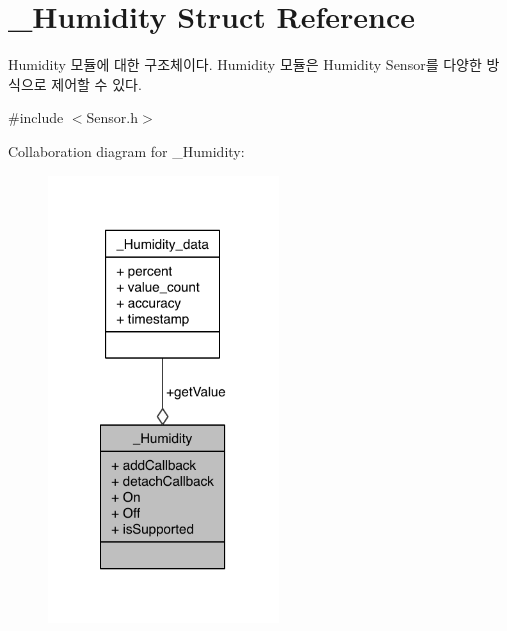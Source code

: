 \hypertarget{struct__Humidity}{\section{\-\_\-\-Humidity Struct Reference}
\label{struct__Humidity}
}


Humidity 모듈에 대한 구조체이다. Humidity 모듈은 Humidity Sensor를 다양한 방식으로 제어할 수 있다.  




{\ttfamily \#include $<$Sensor.\-h$>$}



Collaboration diagram for \-\_\-\-Humidity\-:\nopagebreak
\begin{figure}[H]
\begin{center}
\leavevmode
\includegraphics[width=173pt]{d5/d8c/struct__Humidity__coll__graph}
\end{center}
\end{figure}
